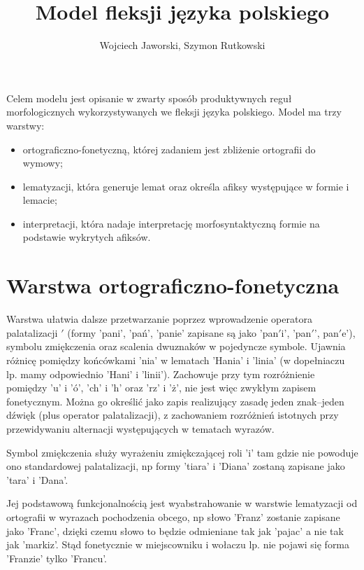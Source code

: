 \documentclass{article}
\title{Model fleksji języka polskiego}
\author{Wojciech Jaworski, Szymon Rutkowski}
\date{}
\begin{document}
\maketitle

Celem modelu jest opisanie w zwarty sposób produktywnych reguł morfologicznych wykorzystywanych we fleksji języka polskiego.
Model ma trzy warstwy:
\begin{itemize}
\item ortograficzno-fonetyczną, której zadaniem jest zbliżenie ortografii do wymowy;
\item lematyzacji, która generuje lemat oraz określa afiksy występujące w formie i lemacie;
\item interpretacji, która nadaje interpretację morfosyntaktyczną formie na podstawie wykrytych afiksów.
\end{itemize}

\section{Warstwa ortograficzno-fonetyczna}\label{sec_phon}

Warstwa ułatwia dalsze przetwarzanie poprzez wprowadzenie operatora palatalizacji $'$ (formy 'pani', 'pań', 'panie' zapisane są jako 'pan$'$i', 'pan$'$', pan$'$e'),
symbolu zmiękczenia  oraz scalenia dwuznaków w pojedyncze symbole. Ujawnia różnicę pomiędzy końcówkami 'nia' w lematach 'Hania'
i 'linia' (w dopełniaczu lp. mamy odpowiednio 'Hani' i 'linii'). Zachowuje przy tym rozróżnienie pomiędzy 'u' i 'ó', 'ch' i 'h' oraz 'rz' i 'ż',
nie jest więc zwykłym zapisem fonetycznym.
Można go określić jako zapis realizujący zasadę jeden znak--jeden dźwięk (plus operator palatalizacji), z zachowaniem rozróżnień istotnych przy przewidywaniu alternacji występujących w tematach wyrazów.

Symbol zmiękczenia służy wyrażeniu zmiękczającej roli 'i' tam gdzie nie powoduje ono standardowej palatalizacji, np formy 'tiara' i 'Diana'
zostaną zapisane jako 'tara' i 'Dana'.

Jej podstawową funkcjonalnością jest wyabstrahowanie w warstwie lematyzacji od ortografii w wyrazach pochodzenia obcego,
np słowo 'Franz' zostanie zapisane jako 'Franc', dzięki czemu słowo to będzie odmieniane tak jak 'pajac' a nie tak jak 'markiz'.
Stąd fonetycznie w miejscowniku i wołaczu lp. nie pojawi się forma 'Franzie' tylko 'Francu'.%
\end{document}
